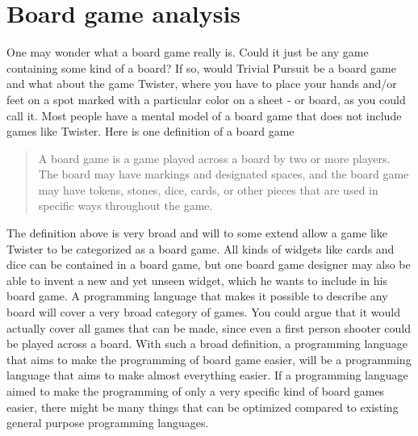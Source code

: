 \section{Board game analysis}
\label{sec:board-game-analysis}

One may wonder what a board game really is. 
Could it just be any game containing some kind of a board? 
If so, would Trivial Pursuit be a board game and what about the game Twister, where you have to place your hands and/or feet on a spot marked with a particular color on a sheet - or board, as you could call it.
Most people have a mental model of a board game that does not include games like Twister. Here is one definition of a board game

\begin{quote}
A board game is a game played across a board by two or more players. The board may have markings and designated spaces, and the board game may have tokens, stones, dice, cards, or other pieces that are used in specific ways throughout the game.
\end{quote} \cite{def-board-game}

The definition above is very broad and will to some extend allow a game like Twister to be categorized as a board game. 
All kinds of widgets like cards and dice can be contained in a board game, but one board game designer may also be able to invent a new and yet unseen widget, which he wants to include in his board game. 
A programming language that makes it possible to describe any board will cover a very broad category of games. 
You could argue that it would actually cover all games that can be made, since even a first person shooter could be played across a board.
With such a broad definition, a programming language that aims to make the programming of board game easier, will be a programming language that aims to make almost everything easier.
If a programming language aimed to make the programming of only a very specific kind of board games easier, there might be many things that can be optimized compared to existing general purpose programming languages.